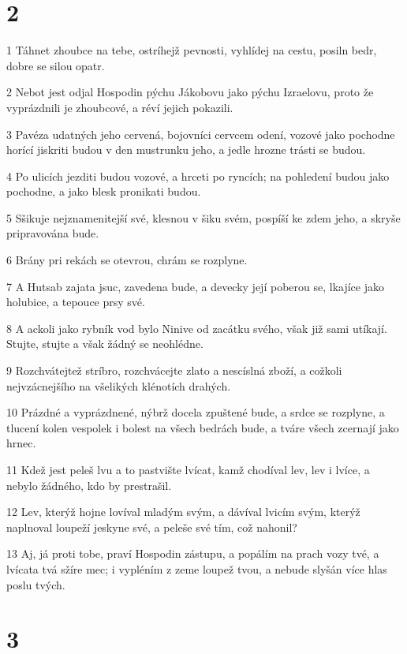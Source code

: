 \chapter{2}

\par 1 Táhnet zhoubce na tebe, ostríhejž pevnosti, vyhlídej na cestu, posiln bedr, dobre se silou opatr.
\par 2 Nebot jest odjal Hospodin pýchu Jákobovu jako pýchu Izraelovu, proto že vyprázdnili je zhoubcové, a réví jejich pokazili.
\par 3 Pavéza udatných jeho cervená, bojovníci cervcem odení, vozové jako pochodne horící jiskriti budou v den mustrunku jeho, a jedle hrozne trásti se budou.
\par 4 Po ulicích jezditi budou vozové, a hrceti po ryncích; na pohledení budou jako pochodne, a jako blesk pronikati budou.
\par 5 Sšikuje nejznamenitejší své, klesnou v šiku svém, pospíší ke zdem jeho, a skryše pripravována bude.
\par 6 Brány pri rekách se otevrou, chrám se rozplyne.
\par 7 A Hutsab zajata jsuc, zavedena bude, a devecky její poberou se, lkajíce jako holubice, a tepouce prsy své.
\par 8 A ackoli jako rybník vod bylo Ninive od zacátku svého, však již sami utíkají. Stujte, stujte a však žádný se neohlédne.
\par 9 Rozchvátejtež stríbro, rozchvácejte zlato a nescíslná zboží, a cožkoli nejvzácnejšího na všelikých klénotích drahých.
\par 10 Prázdné a vyprázdnené, nýbrž docela zpuštené bude, a srdce se rozplyne, a tlucení kolen vespolek i bolest na všech bedrách bude, a tváre všech zcernají jako hrnec.
\par 11 Kdež jest peleš lvu a to pastvište lvícat, kamž chodíval lev, lev i lvíce, a nebylo žádného, kdo by prestrašil.
\par 12 Lev, kterýž hojne lovíval mladým svým, a dávíval lvicím svým, kterýž naplnoval loupeží jeskyne své, a peleše své tím, což nahonil?
\par 13 Aj, já proti tobe, praví Hospodin zástupu, a popálím na prach vozy tvé, a lvícata tvá sžíre mec; i vypléním z zeme loupež tvou, a nebude slyšán více hlas poslu tvých.

\chapter{3}

